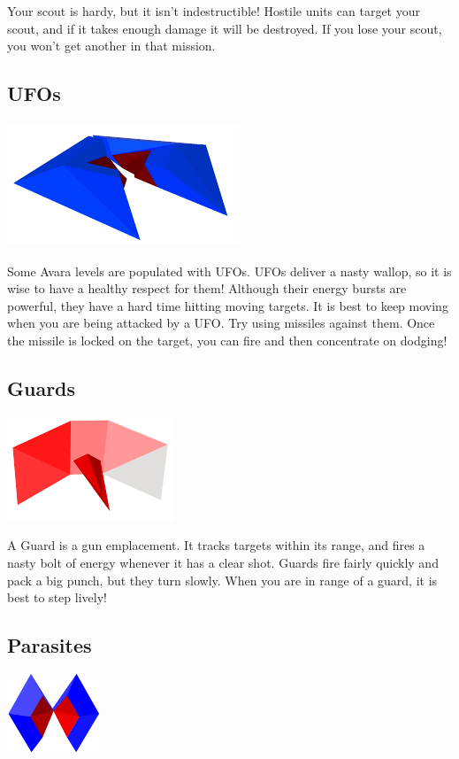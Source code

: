 \documentclass{article}
\begin{document}
Your scout is hardy, but it isn't indestructible! Hostile units can target your scout, and if it takes enough damage it will be destroyed. If you lose your scout, you won't get another in that mission.

\subsection{UFOs}
\begin{center}
	\includegraphics{img/12.pdf}
\end{center}

Some Avara levels are populated with UFOs. UFOs deliver a nasty wallop, so it is wise to have a healthy respect for them! Although their energy bursts are powerful, they have a hard time hitting moving targets. It is best to keep moving when you are being attacked by a UFO. Try using missiles against them. Once the missile is locked on the target, you can fire and then concentrate on dodging!

\subsection{Guards}
\begin{center}
	\includegraphics{img/13.pdf}
\end{center}

A Guard is a gun emplacement. It tracks targets within its range, and fires a nasty bolt of energy whenever it has a clear shot. Guards fire fairly quickly and pack a big punch, but they turn slowly. When you are in range of a guard, it is best to step lively!

\subsection{Parasites}
\begin{center}
	\includegraphics{img/14.pdf}
\end{center}
\end{document}
